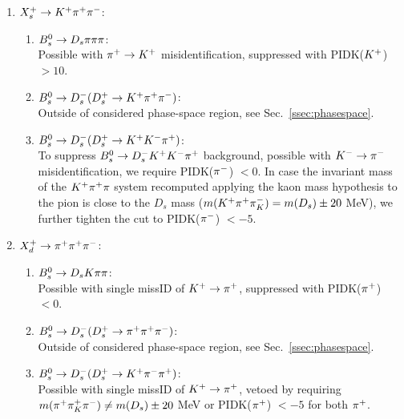 \begin{enumerate}

	\item $X_s^+ \to \Kp \pip \pim$:
		\begin{enumerate}
			\item $\Bs\to\Ds\pion\pion\pion$: \\
			Possible with $\pip \to \Kp$ misidentification, suppressed with PIDK($\Kp$) $>10$.
			
			\item $\Bs\to\Dsm (\Dsp \to \Kp \pip \pim)$: \\ Outside of considered phase-space region, see Sec.~\ref{ssec:phasespace}.

			\item $\Bs\to\Dsm (\Dsp \to \Kp \Km \pip)$: \\
			To suppress $\Bs\to\Dsm \Kp \Km \pip$ background, possible with $\Km \to \pim$ misidentification, we require PIDK($\pim$) $< 0$.
			In case the invariant mass of the $\Kp \pip \pi$ system recomputed applying the kaon mass hypothesis to the pion
			is close to the $D_s$ mass ($m(\Kp \pip \pi^-_K) = m(D_s) \pm 20$ MeV),
			we further tighten the cut to PIDK($\pim$) $< -5$.

		\end{enumerate}

	\item $X_d^+ \to \pip \pip \pim$:
		\begin{enumerate}
			\item $\Bs\to\Ds\kaon\pion\pion$: \\
			Possible with single missID of $\Kp \to \pip$, suppressed with PIDK($\pip$) $<0$.

			\item $\Bs\to\Dsm (\Dsp \to \pip \pip \pim)$:  \\ Outside of considered phase-space region, see Sec.~\ref{ssec:phasespace}.
			
			\item $\Bs\to\Dsm (\Dsp \to \Kp \pim \pip)$: \\
			Possible with single missID of $\Kp \to \pip$, vetoed by requiring
			$m(\pip \pi^+_K \pim) \ne m(D_s) \pm 20$ MeV or PIDK($\pip$) $<-5$ for both $\pip$.
			

		\end{enumerate}
\end{enumerate}


